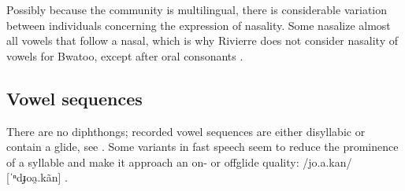 	
	Possibly because the community is multilingual, there is considerable variation between individuals concerning the expression of nasality. Some nasalize almost all vowels that follow a nasal, which is why Rivierre does not consider nasality of vowels for Bwatoo, except after oral consonants \citeyearpar[25]{rivierre_bwatoo_2006}. %
	
	\subsection{Vowel sequences}
	\begin{sloppypar}
	There are no diphthongs; recorded vowel sequences are either disyllabic or contain a glide, see . Some variants in fast speech seem to reduce the prominence of a syllable and make it approach an on- or offglide quality: /jo.a.kan/ [ˈⁿdɟoa̯.kãn] .
	\end{sloppypar}
	

